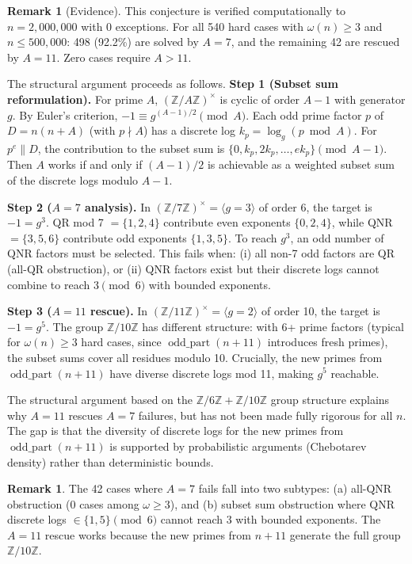 \documentclass[11pt,a4paper]{article}
\theoremstyle{plain}
\theoremstyle{plain}
\theoremstyle{definition}
\newtheorem{remark}[theorem]{Remark}
\numberwithin{equation}{section}
\begin{document}
\begin{remark}[Evidence]
This conjecture is verified computationally to $n = 2{,}000{,}000$ with 0 exceptions. For all 540 hard cases with $\omega(n) \geq 3$ and $n \leq 500{,}000$: 498 (92.2\%) are solved by $A = 7$, and the remaining 42 are rescued by $A = 11$. Zero cases require $A > 11$.

The structural argument proceeds as follows. \textbf{Step 1 (Subset sum reformulation).} For prime $A$, $(\mathbb{Z}/A\mathbb{Z})^\times$ is cyclic of order $A - 1$ with generator $g$. By Euler's criterion, $-1 \equiv g^{(A-1)/2} \pmod{A}$. Each odd prime factor $p$ of $D = n(n+A)$ (with $p \nmid A$) has a discrete log $k_p = \log_g(p \bmod A)$. For $p^e \| D$, the contribution to the subset sum is $\{0, k_p, 2k_p, \ldots, ek_p\} \pmod{A-1}$. Then $A$ works if and only if $(A-1)/2$ is achievable as a weighted subset sum of the discrete logs modulo $A - 1$.

\textbf{Step 2 ($A = 7$ analysis).} In $(\mathbb{Z}/7\mathbb{Z})^\times = \langle g = 3 \rangle$ of order 6, the target is $-1 = g^3$. QR mod 7 $= \{1, 2, 4\}$ contribute even exponents $\{0, 2, 4\}$, while QNR $= \{3, 5, 6\}$ contribute odd exponents $\{1, 3, 5\}$. To reach $g^3$, an odd number of QNR factors must be selected. This fails when: (i) all non-7 odd factors are QR (all-QR obstruction), or (ii) QNR factors exist but their discrete logs cannot combine to reach $3 \pmod{6}$ with bounded exponents.

\textbf{Step 3 ($A = 11$ rescue).} In $(\mathbb{Z}/11\mathbb{Z})^\times = \langle g = 2 \rangle$ of order 10, the target is $-1 = g^5$. The group $\mathbb{Z}/10\mathbb{Z}$ has different structure: with 6+ prime factors (typical for $\omega(n) \geq 3$ hard cases, since $\operatorname{odd\_part}(n+11)$ introduces fresh primes), the subset sums cover all residues modulo 10. Crucially, the new primes from $\operatorname{odd\_part}(n+11)$ have diverse discrete logs mod 11, making $g^5$ reachable.

The structural argument based on the $\mathbb{Z}/6\mathbb{Z} + \mathbb{Z}/10\mathbb{Z}$ group structure explains why $A = 11$ rescues $A = 7$ failures, but has not been made fully rigorous for all $n$. The gap is that the diversity of discrete logs for the new primes from $\operatorname{odd\_part}(n+11)$ is supported by probabilistic arguments (Chebotarev density) rather than deterministic bounds.
\end{remark}

\begin{remark}
The 42 cases where $A = 7$ fails fall into two subtypes: (a) all-QNR obstruction (0 cases among $\omega \geq 3$), and (b) subset sum obstruction where QNR discrete logs $\in \{1, 5\} \pmod{6}$ cannot reach $3$ with bounded exponents. The $A = 11$ rescue works because the new primes from $n + 11$ generate the full group $\mathbb{Z}/10\mathbb{Z}$.
\end{remark}
\end{document}
